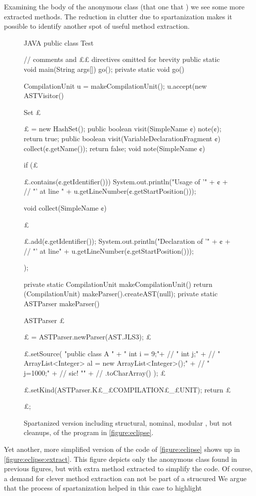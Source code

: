 Examining the body of the anonymous class (that one that  )
we see some more extracted methods. The reduction in clutter due to
spartanization makes it possible to identify another spot of useful method
extraction.

\begin{figure}
  \caption{Spartanized version including structural, nominal, modular , but
    not cleanups, of the \Java program in \cref{figure:eclipse}.}
  \label{figure:eclipse:spartan}
  \def\ignore#1{}
  \begin{adjustbox}{max width = \columnwidth}
\begin{code}[minipage, width=1.13\columnwidth]{JAVA}
public class Test { // comments and ££ directives omitted for brevity
  public static void main(String args[]) { go(); }
  private static void go() {
    CompilationUnit u = makeCompilationUnit();
    u.accept(new ASTVisitor() {
      Set £\ignore$£$ = new HashSet();
      public boolean visit(SimpleName ¢) {
        note(¢);
        return true;
      }
      public boolean visit(VariableDeclarationFragment ¢) {
        collect(¢.getName());
        return false;
      }
      void note(SimpleName ¢) {
        if (£\ignore$£$.contains(¢.getIdentifier()))
          System.out.println("Usage of '" + ¢ + //
            "' at line " + u.getLineNumber(¢.getStartPosition()));
      }
      void collect(SimpleName ¢) {
        £\ignore$£$.add(¢.getIdentifier());
        System.out.println("Declaration of '" + ¢ + //
          "' at line" + u.getLineNumber(¢.getStartPosition()));
      }
    });
  }
  private static CompilationUnit makeCompilationUnit() {
    return (CompilationUnit) makeParser().createAST(null);
  }
  private static ASTParser makeParser() {
    ASTParser £\ignore$£$ = ASTParser.newParser(AST.JLS3);
    £\ignore$£$.setSource(
      "public class A {\n" +
      " int i = 9;\n"+ //
      " int j;\n" + //
      " ArrayList<Integer> al = new ArrayList<Integer>();\n" + //
      " j=1000;\n" + // sic!
      "}\n" + //
      .toCharArray()
    );
    £\ignore$£$.setKind(ASTParser.K£\_£COMPILATION£\_£UNIT);
    return £\ignore$£$;
  }
}
\end{code}
  \end{adjustbox}
\end{figure}

Yet another, more simplified version of the code of \cref{figure:eclipse} shows
up in \cref{figure:eclipse:extract}. This figure depicts only the anonymous
class found in previous figures, but with extra method extracted to simplify
the code. Of course, a demand for clever method extraction can not be part of a
strucured We argue that the
process of spartanization helped in
this case to highlight  

